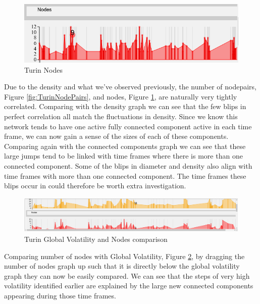 \begin{figure}[h!]
  \begin{center}
  \includegraphics[trim={0 0 0 0}, width=140mm]{./Figures/TurinNodes.png}
  \caption{Turin Nodes}
  \label{fig:TurinNodes}
  \end{center}
\end{figure}
Due to the density and what we've observed previously, the number of nodepairs, Figure \ref{fig:TurinNodePairs}, and nodes, Figure \ref{fig:TurinNodes}, are naturally very tightly correlated. Comparing with the density graph we can see that the few blips in perfect correlation all match the fluctuations in density. Since we know this network tends to have one active fully connected component active in each time frame, we can now gain a sense of the sizes of each of these components. Comparing again with the connected components graph we can see that these large jumps tend to be linked with time frames where there is more than one connected component. Some of the blips in diameter and density also align with time frames with more than one connected component. The time frames these blips occur in could therefore be worth extra investigation.
    
\begin{figure}[h!]
  \begin{center}
  \includegraphics[trim={0 0 0 0}, width=140mm]{./Figures/TurinGlobalVolatilityAndNodes.png}
  \caption{Turin Global Volatility and Nodes comparison}
  \label{fig:TurinGlobalVolatilityAndNodes}
  \end{center}
\end{figure}

Comparing number of nodes with Global Volatility, Figure \ref{fig:TurinGlobalVolatilityAndNodes}, by dragging the number of nodes graph up such that it is directly below the global volatility graph they can now be easily compared. We can see that the steps of very high volatility identified earlier are explained by the large new connected components appearing during those time frames.
   
